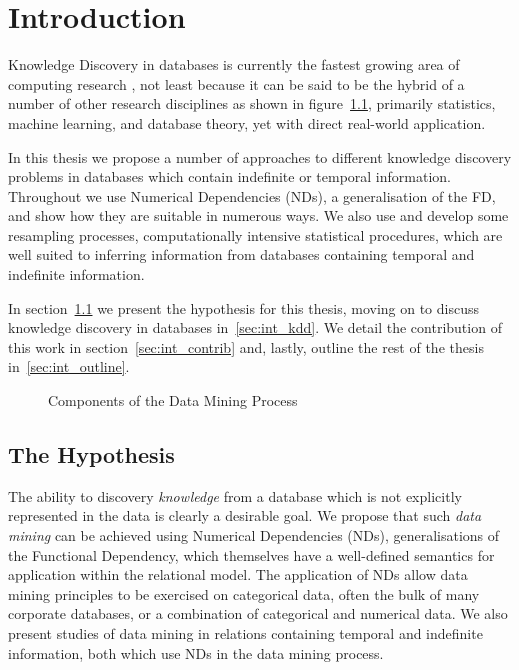 \chapter{Introduction}\label{chap:intro}

Knowledge Discovery in databases is currently the fastest
growing area of computing research \cite{knowdisc91}, not least because it can be said
to be the hybrid of a number of other research disciplines as shown in
figure~\ref{fig:dm_process}, primarily statistics, machine learning,
and database theory, yet with direct real-world application.

\medskip

In this thesis we propose a number of approaches to different
knowledge discovery
problems in databases which contain indefinite or temporal
information. Throughout we use Numerical Dependencies (NDs), a
generalisation of the FD, and 
show how they are suitable in numerous ways.  We also use and develop some
resampling processes, computationally intensive statistical
procedures, which are well suited to inferring information from
databases containing temporal and indefinite information. 

In section~\ref{sec:int_hyp} we present the hypothesis for this
thesis, moving on to discuss knowledge discovery in databases
in~\ref{sec:int_kdd}. We detail the contribution of this work in
section~\ref{sec:int_contrib} and, lastly, outline the rest of the
thesis in~\ref{sec:int_outline}.

\begin{figure}
\centerline{}
\caption{\label{fig:dm_process}Components of the Data
Mining Process}
\end{figure}

\section{The Hypothesis}\label{sec:int_hyp}

The ability to discovery {\em knowledge} from a database which is not
explicitly represented in the data is clearly a desirable goal. We
propose that such {\em data mining} can be achieved using Numerical
Dependencies (NDs), generalisations of the Functional Dependency,
which themselves have a well-defined semantics for application within
the relational model. The application of NDs allow data
mining principles to be exercised on categorical data, often the bulk
of many corporate databases, or a combination of categorical and
numerical data. We also present studies of data mining in
relations containing temporal and indefinite information, both which
use NDs in the data mining process.


